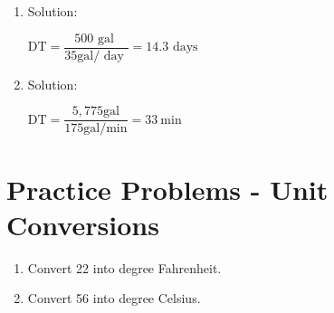 \begin{enumerate}
\item Solution:\\

\vspace{0.4cm}

$
\mathrm{DT}=\dfrac{500 \text { gal }}{35 \mathrm{gal} / \text { day }}=14.3 \text { days }
$
\vspace{0.4cm}

\item Solution:\\

\vspace{0.4cm}

$
\mathrm{DT}=\dfrac{5,775 \mathrm{gal}}{175 \mathrm{gal} / \mathrm{min}}=33 \mathrm{~min}
$

\end{enumerate}
\vspace{1cm}

\section*{Practice Problems - Unit Conversions}
\begin{enumerate}
\item Convert 22 into degree Fahrenheit.
\item Convert 56 into degree Celsius.
\end{enumerate}
\vspace{1cm}

